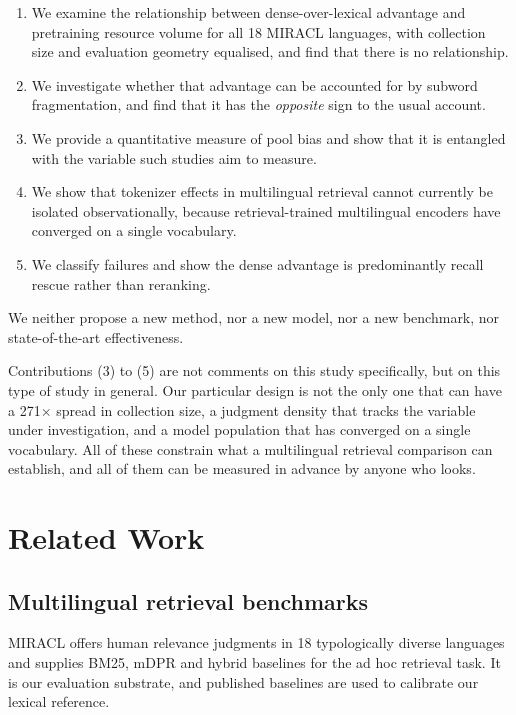 \documentclass{ijimai_article}
\begin{document}
\begin{enumerate}
\item We examine the relationship between dense-over-lexical advantage and pretraining
      resource volume for all 18 MIRACL languages, with collection size and evaluation
      geometry equalised, and find that there is no relationship.
\item We investigate whether that advantage can be accounted for by subword
      fragmentation, and find that it has the \emph{opposite} sign to the usual account.
\item We provide a quantitative measure of pool bias and show that it is entangled with
      the variable such studies aim to measure.
\item We show that tokenizer effects in multilingual retrieval cannot currently be
      isolated observationally, because retrieval-trained multilingual encoders
      have converged on a single vocabulary.
\item We classify failures and show the dense advantage is predominantly recall
      rescue rather than reranking.
\end{enumerate}

We neither propose a new method, nor a new model, nor a new benchmark, nor
state-of-the-art effectiveness.

Contributions (3) to (5) are not comments on this study specifically, but on this type
of study in general. Our particular design is not the only one that can have a
271$\times$ spread in collection size, a judgment density that tracks the variable under
investigation, and a model population that has converged on a single vocabulary. All of
these constrain what a multilingual retrieval comparison can establish, and all of them
can be measured in advance by anyone who looks.

\section{Related Work}

\subsection{Multilingual retrieval benchmarks}
MIRACL \cite{zhang2023} offers human relevance judgments in 18 typologically diverse
languages and supplies BM25, mDPR and hybrid baselines for the ad hoc retrieval task.
It is our evaluation substrate, and published baselines are used to calibrate our
lexical reference.
\end{document}
